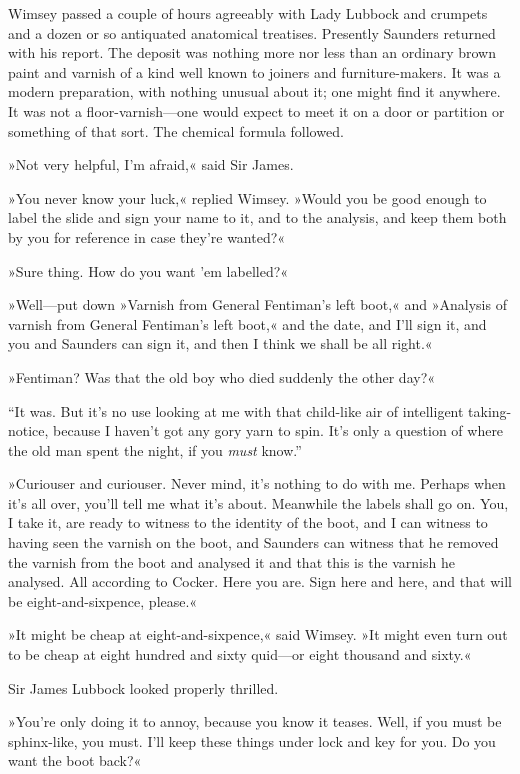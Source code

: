 Wimsey passed a couple of hours agreeably with Lady Lubbock and crumpets and a dozen or so antiquated anatomical treatises. Presently Saunders returned with his report. The deposit was nothing more nor less than an ordinary brown paint and varnish of a kind well known to joiners and furniture-makers. It was a modern preparation, with nothing unusual about it; one might find it anywhere. It was not a floor-varnish\allowbreak---\allowbreak one would expect to meet it on a door or partition or something of that sort. The chemical formula followed.

»Not very helpful, I'm afraid,« said Sir James.

»You never know your luck,« replied Wimsey. »Would you be good enough to label the slide and sign your name to it, and to the analysis, and keep them both by you for reference in case they're wanted?«

»Sure thing. How do you want 'em labelled?«

»Well\allowbreak---\allowbreak put down »Varnish from General Fentiman's left boot,« and »Analysis of varnish from General Fentiman's left boot,« and the date, and I'll sign it, and you and Saunders can sign it, and then I think we shall be all right.«

»Fentiman? Was that the old boy who died suddenly the other day?«

\enquote{It was. But it's no use looking at me with that child-like air of intelligent taking-notice, because I haven't got any gory yarn to spin. It's only a question of where the old man spent the night, if you \textit{must} know.}

»Curiouser and curiouser. Never mind, it's nothing to do with me. Perhaps when it's all over, you'll tell me what it's about. Meanwhile the labels shall go on. You, I take it, are ready to witness to the identity of the boot, and I can witness to having seen the varnish on the boot, and Saunders can witness that he removed the varnish from the boot and analysed it and that this is the varnish he analysed. All according to Cocker. Here you are. Sign here and here, and that will be eight-and-sixpence, please.«

»It might be cheap at eight-and-sixpence,« said Wimsey. »It might even turn out to be cheap at eight hundred and sixty quid\allowbreak---\allowbreak or eight thousand and sixty.«

Sir James Lubbock looked properly thrilled.

»You're only doing it to annoy, because you know it teases. Well, if you must be sphinx-like, you must. I'll keep these things under lock and key for you. Do you want the boot back?«

